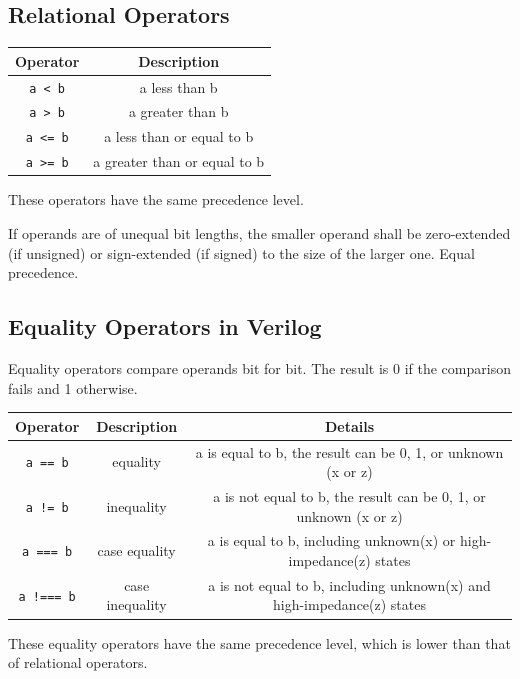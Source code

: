 \documentclass[12pt,openany]{book}
\begin{document}
\vspace*{-30px}
\subsection{Relational Operators}

\begin{center}
	    \begin{tabular}{c|c}
	        \hline
	        \textbf{Operator} & \textbf{Description} \\
	        \hline
	        \texttt{a < b} & a less than b \\
	        \texttt{a > b} & a greater than b \\
	        \texttt{a <= b} & a less than or equal to b \\
	        \texttt{a >= b} & a greater than or equal to b \\
	        \hline
	    \end{tabular}
\end{center}
These operators have the same precedence level.

If operands are of unequal bit lengths, the smaller operand shall be zero-extended (if unsigned) or sign-extended (if signed) to the size of the larger one. Equal precedence.
\vspace*{20px}
\subsection{Equality Operators in Verilog}
Equality operators compare operands bit for bit. The result is 0 if the comparison fails and 1 otherwise.

    


\begin{center}
	\begin{tabular}{|c|c|c|}
		\hline
		\textbf{Operator} & \textbf{Description} & \textbf{Details} \\
		\hline
		\texttt{a == b} & equality & a is equal to b, the result can be 0, 1, or unknown (x or z) \\
		\texttt{a != b} & inequality & a is not equal to b, the result can be 0, 1, or unknown (x or z) \\
		\texttt{a === b} & case equality & a is equal to b, including unknown(x) or high-impedance(z) states \\
		\texttt{a !=== b} & case inequality & a is not equal to b, including unknown(x) and high-impedance(z) states \\
		\hline
	\end{tabular}
\end{center}
These equality operators have the same precedence level, which is lower than that of relational operators.
\end{document}
